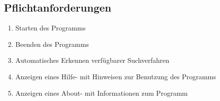 \subsection{Pflichtanforderungen}
\begin{enumerate} [label=\bfseries /F \arabic*0/, leftmargin=*]
	\item Starten des Programms \label{f:programmstart}
	\item Beenden des Programms \label{f:beenden}
	\item Automatisches Erkennen verfügbarer Suchverfahren \label{f:erkennen_suchverfahren}
	\item Anzeigen eines Hilfe- mit Hinweisen zur Benutzung des Programms \label{f:hilfe}
	\item Anzeigen eines About- mit Informationen zum Programm \label{f:about}
	\newline
 

\end{enumerate}

